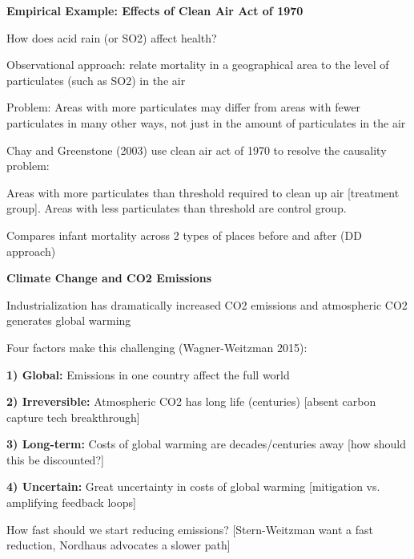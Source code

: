 \documentclass[landscape]{slides}
\begin{document}
\begin{slide}
\begin{center}
{\bf Empirical Example: Effects of Clean Air Act of 1970}
\end{center}
How does acid rain (or SO2) affect health?

Observational approach: relate mortality in a geographical area to the level of particulates (such as SO2) in the air

Problem: Areas with more particulates may differ from areas with fewer particulates in many other ways, not just in the amount of particulates in the air

Chay and Greenstone (2003) use clean air act of 1970 to resolve the causality problem:

Areas with more particulates than threshold required to clean up air [treatment group]. Areas with less particulates
than threshold are control group.

Compares infant mortality across 2 types of places before and after (DD approach)

\end{slide}

\begin{slide}

\end{slide}

\begin{slide}
\begin{center}
{\bf Climate Change and CO2 Emissions}
\end{center}
Industrialization has dramatically increased CO2 emissions
and atmospheric CO2 generates global warming

Four factors make this challenging (Wagner-Weitzman 2015): 

\textbf{1) Global:} Emissions in one country affect the full world

\textbf{2) Irreversible:} Atmospheric CO2 has long life (centuries) [absent carbon capture tech breakthrough]

\textbf{3) Long-term:} Costs of global warming are decades/centuries away [how should this be discounted?]

\textbf{4) Uncertain:} Great uncertainty in costs of global warming [mitigation vs. amplifying feedback loops]

How fast should we start reducing emissions? [Stern-Weitzman want a fast reduction, Nordhaus advocates a 
slower path]

\end{slide}
\end{document}
